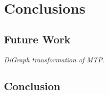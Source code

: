 
\chapter{Conclusions}

\section{Future Work}

\textit{DiGraph transformation of MTP.}

\section{Conclusion}


